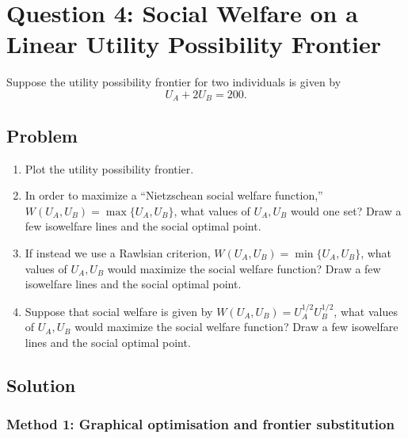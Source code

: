 \documentclass[12pt]{article}
\begin{document}
\newpage
\section{Question 4: Social Welfare on a Linear Utility Possibility Frontier}

\noindent
Suppose the utility possibility frontier for two individuals is given by
\[
U_A + 2U_B = 200.
\]

\subsection{Problem}
\begin{enumerate}[label=(\alph*)]
    \item Plot the utility possibility frontier.
    \item In order to maximize a ``Nietzschean social welfare function,'' $W(U_A,U_B)=\max\{U_A,U_B\}$, what values of $U_A,U_B$ would one set? Draw a few isowelfare lines and the social optimal point.
    \item If instead we use a Rawlsian criterion, $W(U_A,U_B)=\min\{U_A,U_B\}$, what values of $U_A,U_B$ would maximize the social welfare function? Draw a few isowelfare lines and the social optimal point.
    \item Suppose that social welfare is given by $W(U_A,U_B)=U_A^{1/2}U_B^{1/2}$, what values of $U_A,U_B$ would maximize the social welfare function? Draw a few isowelfare lines and the social optimal point.
\end{enumerate}

\newpage
\subsection{Solution}

\subsubsection{Method 1: Graphical optimisation and frontier substitution}
\end{document}

